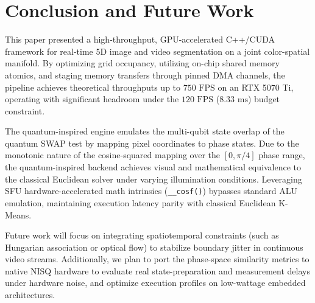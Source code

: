 \section{Conclusion and Future Work}\label{sec:conclusion}
This paper presented a high-throughput, GPU-accelerated C++/CUDA framework for real-time 5D image and video segmentation on a joint color-spatial manifold. By optimizing grid occupancy, utilizing on-chip shared memory atomics, and staging memory transfers through pinned DMA channels, the pipeline achieves theoretical throughputs up to $750\text{ FPS}$ on an RTX 5070 Ti, operating with significant headroom under the $120\text{ FPS}$ ($8.33\text{ ms}$) budget constraint.

The quantum-inspired engine emulates the multi-qubit state overlap of the quantum SWAP test by mapping pixel coordinates to phase states. Due to the monotonic nature of the cosine-squared mapping over the $[0, \pi/4]$ phase range, the quantum-inspired backend achieves visual and mathematical equivalence to the classical Euclidean solver under varying illumination conditions. Leveraging SFU hardware-accelerated math intrinsics (\texttt{\_\_cosf()}) bypasses standard ALU emulation, maintaining execution latency parity with classical Euclidean K-Means.

Future work will focus on integrating spatiotemporal constraints (such as Hungarian association or optical flow) to stabilize boundary jitter in continuous video streams. Additionally, we plan to port the phase-space similarity metrics to native NISQ hardware to evaluate real state-preparation and measurement delays under hardware noise, and optimize execution profiles on low-wattage embedded architectures.
